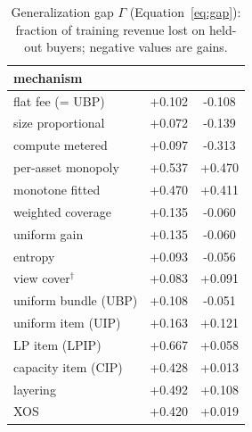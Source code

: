 \begin{table}[t]
  \centering
  \caption{Generalization gap $\Gamma$ (Equation~\eqref{eq:gap}): fraction of training revenue lost on held-out buyers; negative values are gains.}
  \label{tab:generalization}
  \begin{tabular}{lcc}
    \toprule
    mechanism & \tpch{} & \sqlshare{} \\
    \midrule
    flat fee (= UBP) & +0.102 & -0.108 \\
    size proportional & +0.072 & -0.139 \\
    compute metered & +0.097 & -0.313 \\
    per-asset monopoly & +0.537 & +0.470 \\
    monotone fitted & +0.470 & +0.411 \\
    \qirana{} weighted coverage & +0.135 & -0.060 \\
    \qirana{} uniform gain & +0.135 & -0.060 \\
    \qirana{} entropy & +0.093 & -0.056 \\
    \querymarket{} view cover$^{\dagger}$ & +0.083 & +0.091 \\
    uniform bundle (UBP) & +0.108 & -0.051 \\
    uniform item (UIP) & +0.163 & +0.121 \\
    LP item (LPIP) & +0.667 & +0.058 \\
    capacity item (CIP) & +0.428 & +0.013 \\
    layering & +0.492 & +0.108 \\
    XOS & +0.420 & +0.019 \\
    \bottomrule
  \end{tabular}
\end{table}

